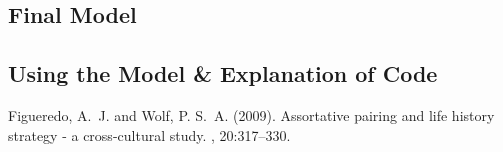 \documentclass[twoside,twocolumn]{article}
\begin{document}
\subsection{Final Model}

\subsection{Using the Model & Explanation of Code}



\begin{thebibliography}{99} %

Figueredo, A.~J. and Wolf, P. S.~A. (2009).
\newblock Assortative pairing and life history strategy - a cross-cultural
  study.
, 20:317--330.
 
\end{thebibliography}

\end{document}
